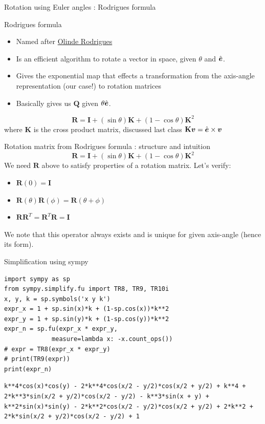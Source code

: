 \documentclass[presentation]{beamer}
\newcommand{\gv}[1]{\ensuremath{\mbox{\boldmath$ #1 $}}}
\newcommand{\bv}[1]{\ensuremath{\mathbf{#1}}}
\begin{document}
\begin{frame}[label={sec:org49088fb}]{Rotation using Euler angles : Rodrigues formula}
\begin{block}{Rodrigues formula}
\begin{itemize}
\item Named after \href{https://en.wikipedia.org/wiki/Olinde\_Rodrigues}{Olinde Rodrigues}
\item Is an efficient algorithm to rotate a vector in space, given \(\theta\)
and \(\hat{\gv{e}}\).
\item Gives the exponential map that effects a transformation from the
axis-angle representation (our case!) to rotation matrices
\item Basically gives us \(\bv{Q}\) given \(\theta \hat{\gv{e}}\).
\end{itemize}
\[ \mathbf {R} =\mathbf {I} +(\sin \theta )\mathbf {K} +(1-\cos \theta )\mathbf {K} ^{2} \]
where \(\mathbf{K}\) is the cross product matrix, discussed last class \(\mathbf{K}\gv{v} = \hat{\gv{e}} \times \gv{v}\)
\end{block}
\end{frame}
\begin{frame}[label={sec:org4c4fa66}]{Rotation matrix from Rodrigues formula : structure and intuition}
 \[ \mathbf {R} =\mathbf {I} +(\sin \theta )\mathbf {K} +(1-\cos \theta )\mathbf {K} ^{2} \]
We need \(\bv{R}\) above to satisfy properties of a rotation matrix. Let's verify:
\begin{itemize}
\item \(\bv{R}(0) = \bv{I}\)
\item \(\bv{R}(\theta)\bv{R}(\phi) = \bv{R}(\theta+\phi)\)
\item \(\bv{R}\bv{R}^T = \bv{R}^T\bv{R} = \bv{I}\)
\end{itemize}
We note that this operator always exists and is unique for given axis-angle
(hence its form).
\end{frame}
\begin{frame}[label={sec:org13b137e},fragile]{Simplification using sympy}
 \begin{verbatim}
import sympy as sp
from sympy.simplify.fu import TR8, TR9, TR10i
x, y, k = sp.symbols('x y k')
expr_x = 1 + sp.sin(x)*k + (1-sp.cos(x))*k**2
expr_y = 1 + sp.sin(y)*k + (1-sp.cos(y))*k**2
expr_n = sp.fu(expr_x * expr_y,
             measure=lambda x: -x.count_ops())
# expr = TR8(expr_x * expr_y)
# print(TR9(expr))
print(expr_n)
\end{verbatim}

\begin{verbatim}
k**4*cos(x)*cos(y) - 2*k**4*cos(x/2 - y/2)*cos(x/2 + y/2) + k**4 + 2*k**3*sin(x/2 + y/2)*cos(x/2 - y/2) - k**3*sin(x + y) + k**2*sin(x)*sin(y) - 2*k**2*cos(x/2 - y/2)*cos(x/2 + y/2) + 2*k**2 + 2*k*sin(x/2 + y/2)*cos(x/2 - y/2) + 1
\end{verbatim}
\end{frame}
\end{document}
